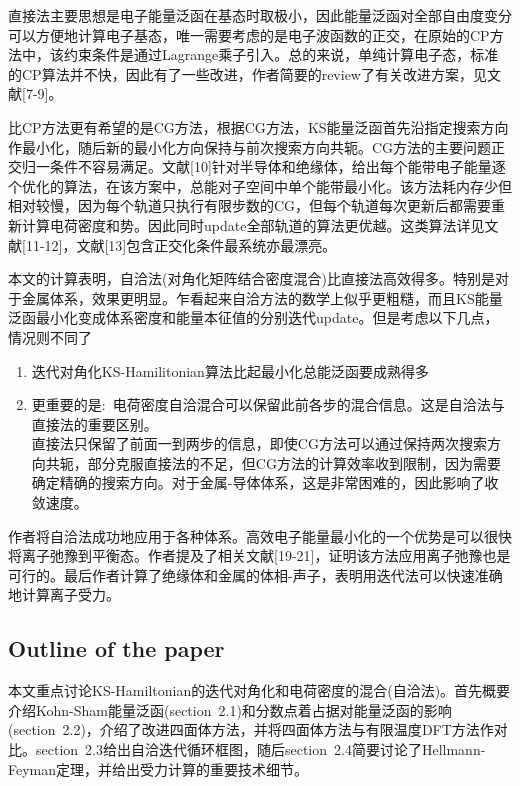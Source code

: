\documentclass[14pt]{article}      %
\begin{document}
直接法主要思想是电子能量泛函在基态时取极小，因此能量泛函对全部自由度变分可以方便地计算电子基态，唯一需要考虑的是电子波函数的正交，在原始的\textrm{CP}方法中，该约束条件是通过\textrm{Lagrange}乘子引入。总的来说，单纯计算电子态，标准的\textrm{CP}算法并不快，因此有了一些改进，作者简要的\textrm{review}了有关改进方案，见文献\textrm{[7-9]}。

比\textrm{CP}方法更有希望的是\textrm{CG}方法，根据\textrm{CG}方法，\textrm{KS}能量泛函首先沿指定搜索方向作最小化，随后新的最小化方向保持与前次搜索方向共轭。\textrm{CG}方法的主要问题正交归一条件不容易满足。文献[10]针对半导体和绝缘体，给出每个能带电子能量逐个优化的算法，在该方案中，总能对子空间中单个能带最小化。该方法耗内存少但相对较慢，因为每个轨道只执行有限步数的\textrm{CG}，但每个轨道每次更新后都需要重新计算电荷密度和势。因此同时\textrm{update}全部轨道的算法更优越。这类算法详见文献[11-12]，文献[13]包含正交化条件最系统亦最漂亮。

本文的计算表明，自洽法(对角化矩阵结合密度混合)比直接法高效得多。特别是对于金属体系，效果更明显。乍看起来自洽方法的数学上似乎更粗糙，而且\textrm{KS}能量泛函最小化变成体系密度和能量本征值的分别迭代\textrm{update}。但是考虑以下几点，情况则不同了
\begin{enumerate}
	\item 迭代对角化\textrm{KS-Hamilitonian}算法比起最小化总能泛函要成熟得多
	\item 更重要的是:~电荷密度自洽混合可以保留此前各步的混合信息。这是自洽法与直接法的重要区别。\\
		直接法只保留了前面一到两步的信息，即使\textrm{CG}方法可以通过保持两次搜索方向共轭，部分克服直接法的不足，但\textrm{CG}方法的计算效率收到限制，因为需要确定精确的搜索方向。对于金属-导体体系，这是非常困难的，因此影响了收敛速度。
\end{enumerate}
作者将自洽法成功地应用于各种体系。高效电子能量最小化的一个优势是可以很快将离子弛豫到平衡态。作者提及了相关文献[19-21]，证明该方法应用离子弛豫也是可行的。最后作者计算了绝缘体和金属的体相-声子，表明用迭代法可以快速准确地计算离子受力。

\subsection{Outline of the paper}
本文重点讨论\textrm{KS-Hamiltonian}的迭代对角化和电荷密度的混合(自洽法)。首先概要介绍\textrm{Kohn-Sham}能量泛函(\textrm{section~2.1})和分数点着占据对能量泛函的影响(\textrm{section~2.2})，介绍了改进四面体方法，并将四面体方法与有限温度\textrm{DFT}方法作对比。\textrm{section~2.3}给出自洽迭代循环框图，随后\textrm{section~2.4}简要讨论了\textrm{Hellmann-Feyman}定理，并给出受力计算的重要技术细节。
\end{document}
